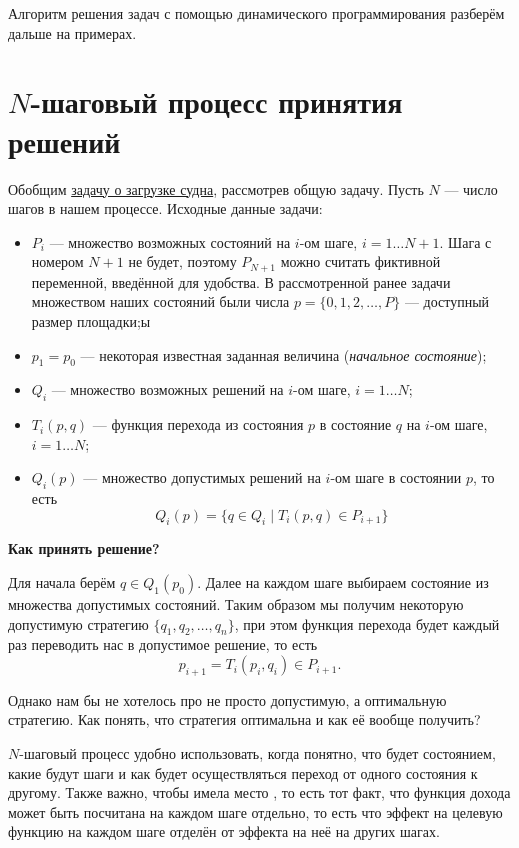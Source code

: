 Алгоритм решения задач с помощью динамического программирования разберём дальше на примерах.

\section{$N$-шаговый процесс принятия решений}\label{n_step_process}

Обобщим \hyperref[pr:loading_vessel]{задачу о загрузке судна}, рассмотрев общую задачу. Пусть $N$ --- число шагов в нашем процессе. Исходные данные задачи:

\begin{itemize}[nosep]
	\item $P_i$ --- множество возможных состояний на $i$-ом шаге, $i = 1 \dots N+1$. Шага с номером $N+1$ не будет, поэтому $P_{N+1}$ можно считать фиктивной переменной, введённой для удобства. В рассмотренной ранее задачи множеством наших состояний были числа $p=\{0, 1, 2, \dots, P\}$ --- доступный размер площадки;ы
	
	\item $p_1 = p_0$ --- некоторая известная заданная величина (\textit{начальное состояние});
	
	\item $Q_i$ --- множество возможных решений на $i$-ом шаге, $i = 1 \dots N$;
	
	\item $T_i(p, q)$ --- функция перехода из состояния $p$ в состояние $q$ на $i$-ом шаге, $i = 1 \dots N$;
	
	\item $Q_i(p)$ --- множество допустимых решений на $i$-ом шаге в состоянии $p$, то есть
	\[
	Q_i(p) = \{q \in Q_i \; \big| \; T_i(p, q) \in P_{i+1}\}
	\]	
\end{itemize}

\textbf{Как принять решение?}

Для начала берём $q \in Q_1(p_0)$. Далее на каждом шаге выбираем состояние из множества допустимых состояний. Таким образом мы получим некоторую допустимую стратегию $\{q_1, q_2, \dots, q_n\}$, при этом функция перехода будет каждый раз переводить нас в допустимое решение, то есть
\[
p_{i+1} = T_i(p_i, q_i) \in P_{i+1}.
\]

Однако нам бы не хотелось про не просто допустимую, а оптимальную стратегию. Как понять, что стратегия оптимальна и как её вообще получить?

\remark

$N$-шаговый процесс удобно использовать, когда понятно, что будет состоянием, какие будут шаги и как будет осуществляться переход от одного состояния к другому. Также важно, чтобы имела место , то есть тот факт, что функция дохода может быть посчитана на каждом шаге отдельно, то есть что эффект на целевую функцию на каждом шаге отделён от эффекта на неё на других шагах.

